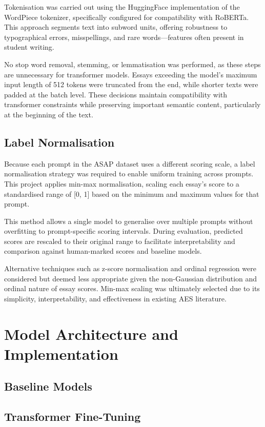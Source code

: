 \documentclass[10pt]{report}
\begin{document}
Tokenisation was carried out using the HuggingFace implementation of the WordPiece tokenizer, specifically configured for compatibility with RoBERTa. This approach segments text into subword units, offering robustness to typographical errors, misspellings, and rare words—features often present in student writing.

No stop word removal, stemming, or lemmatisation was performed, as these steps are unnecessary for transformer models. Essays exceeding the model's maximum input length of 512 tokens were truncated from the end, while shorter texts were padded at the batch level. These decisions maintain compatibility with transformer constraints while preserving important semantic content, particularly at the beginning of the text.

\subsection{Label Normalisation}
Because each prompt in the ASAP dataset uses a different scoring scale, a label normalisation strategy was required to enable uniform training across prompts. This project applies min-max normalisation, scaling each essay’s score to a standardised range of [0, 1] based on the minimum and maximum values for that prompt.

This method allows a single model to generalise over multiple prompts without overfitting to prompt-specific scoring intervals. During evaluation, predicted scores are rescaled to their original range to facilitate interpretability and comparison against human-marked scores and baseline models.

Alternative techniques such as z-score normalisation and ordinal regression were considered but deemed less appropriate given the non-Gaussian distribution and ordinal nature of essay scores. Min-max scaling was ultimately selected due to its simplicity, interpretability, and effectiveness in existing AES literature.


\section{Model Architecture and Implementation}
\subsection{Baseline Models}
\subsection{Transformer Fine-Tuning}
\end{document}
